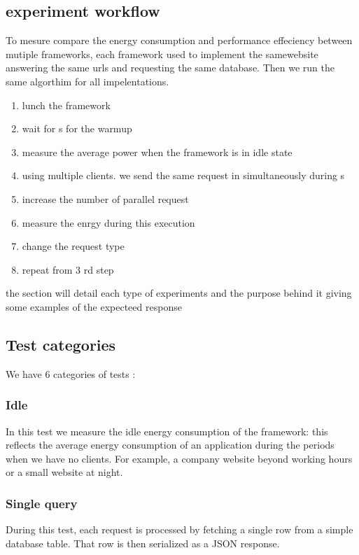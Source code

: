 \subsection{experiment workflow}
To mesure compare the energy consumption and performance effeciency between mutiple frameworks, each framework used to implement the samewebsite answering the same urls and requesting the same database. Then we run the same algorthim for all impelentations.
\begin{enumerate}
    \item lunch the framework
    \item wait for \duration s for the warmup
    \item measure the average power when the framework is in idle state
    \item using multiple clients. we send the same request in simultaneously during \duration s
    \item increase the number of parallel request
    \item measure the enrgy during this execution
    \item change the request type
    \item repeat from 3 rd step
\end{enumerate}
the section will detail each type of experiments  and the purpose behind it giving some examples of the expecteed response

\subsection{Test categories }
We have 6 categories of tests :

\subsubsection{Idle}
In this test we measure the idle energy consumption of the framework: this reflects the average energy consumption of an application during the periods when we have no clients.
For example, a company website beyond working hours or a small website at night.


\subsubsection{Single query}
During this test, each request  is processed by fetching a single row from a simple database table. That row is then serialized as a JSON response.

